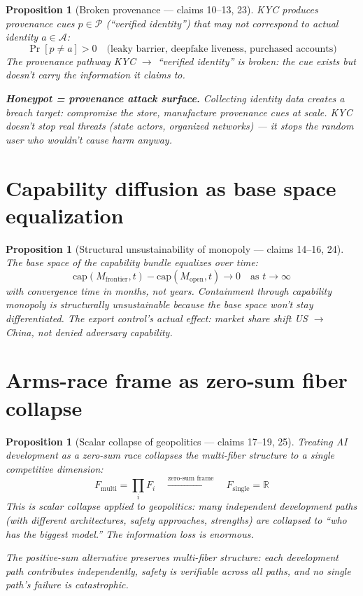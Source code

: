 \documentclass[11pt,a4paper]{article}
\newtheorem{proposition}[definition]{Proposition}
\begin{document}
\begin{proposition}[Broken provenance --- claims 10--13, 23]
\label{prop:kyc}
KYC produces provenance cues $p \in \mathcal{P}$ (``verified identity'')
that may not correspond to actual identity $a \in \mathcal{A}$:
\[
  \Pr[p \neq a] > 0 \quad \text{(leaky barrier, deepfake liveness,
    purchased accounts)}
\]
The provenance pathway KYC $\to$ ``verified identity'' is broken:
the cue exists but doesn't carry the information it claims to.

\textbf{Honeypot = provenance attack surface.} Collecting identity data
creates a breach target: compromise the store, manufacture provenance
cues at scale. KYC doesn't stop real threats (state actors, organized
networks) --- it stops the random user who wouldn't cause harm anyway.
\end{proposition}

\section{Capability diffusion as base space equalization}

\begin{proposition}[Structural unsustainability of monopoly --- claims 14--16, 24]
\label{prop:diffusion}
The base space of the capability bundle equalizes over time:
\[
  \text{cap}(M_{\text{frontier}}, t) - \text{cap}(M_{\text{open}}, t)
    \to 0 \quad \text{as } t \to \infty
\]
with convergence time in months, not years. Containment through
capability monopoly is structurally unsustainable because the base
space won't stay differentiated. The export control's actual effect:
market share shift US $\to$ China, not denied adversary capability.
\end{proposition}

\section{Arms-race frame as zero-sum fiber collapse}

\begin{proposition}[Scalar collapse of geopolitics --- claims 17--19, 25]
\label{prop:zerosum}
Treating AI development as a zero-sum race collapses the multi-fiber
structure to a single competitive dimension:
\[
  F_{\text{multi}} = \prod_i F_i \quad \xrightarrow{\text{zero-sum frame}}
    \quad F_{\text{single}} = \mathbb{R}
\]
This is scalar collapse applied to geopolitics: many independent
development paths (with different architectures, safety approaches,
strengths) are collapsed to ``who has the biggest model.'' The
information loss is enormous.

The positive-sum alternative preserves multi-fiber structure: each
development path contributes independently, safety is verifiable
across all paths, and no single path's failure is catastrophic.
\end{proposition}
\end{document}
